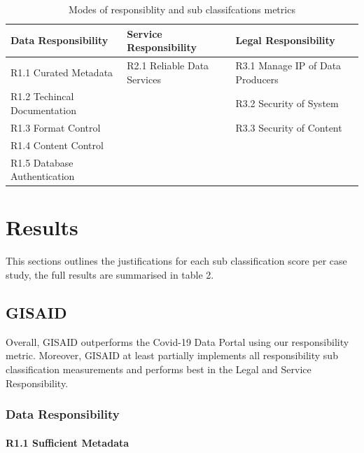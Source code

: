 \documentclass{article}
\begin{document}
\begin{table}[H]

\caption{\label{tab:fig1}Modes of responsiblity and sub classifcations metrics}
\centering
\begin{tabular}[t]{l|l|l}
\hline
Data Responsibility & Service Responsibility & Legal Responsibility\\
\hline
R1.1 Curated Metadata & R2.1 Reliable Data Services & R3.1 Manage IP of Data Producers\\
\hline
R1.2 Techincal Documentation &  & R3.2 Security of System\\
\hline
R1.3 Format Control &  & R3.3 Security of Content\\
\hline
R1.4 Content Control &  & \\
\hline
R1.5  Database Authentication &  & \\
\hline
\end{tabular}
\end{table}

\newpage

\hypertarget{results}{%
\section{Results}\label{results}}

This sections outlines the justifications for each sub classification
score per case study, the full results are summarised in table 2.

\hypertarget{gisaid}{%
\subsection{GISAID}\label{gisaid}}

Overall, GISAID outperforms the Covid-19 Data Portal using our
responsibility metric. Moreover, GISAID at least partially implements
all responsibility sub classification measurements and performs best in
the Legal and Service Responsibility.

\hypertarget{data-responsibility-1}{%
\subsubsection{Data Responsibility}\label{data-responsibility-1}}

\hypertarget{r1.1-sufficient-metadata}{%
\paragraph{R1.1 Sufficient Metadata}\label{r1.1-sufficient-metadata}}
\end{document}
